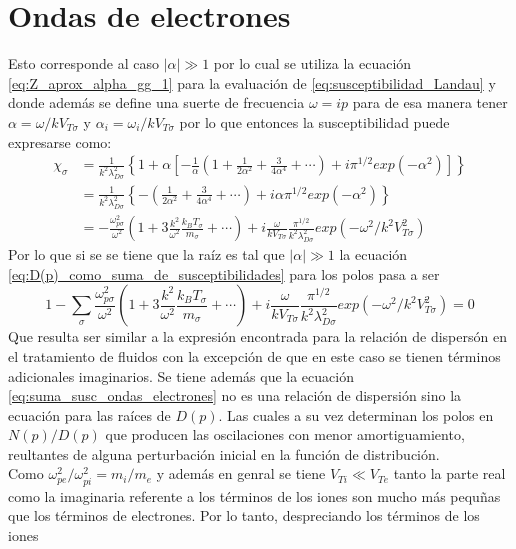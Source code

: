 \documentclass[../tesis_main_file.tex]{subfiles}
\begin{document}
\section{Ondas de electrones}
Esto corresponde al caso $|\alpha| \gg 1$ por lo cual se utiliza la ecuación \ref{eq:Z_aprox_alpha_gg_1} para la evaluación de \ref{eq:susceptibilidad_Landau} y donde además se define una suerte de frecuencia $\omega = ip$ para de esa manera tener $\alpha = \omega /kV_{T\sigma}$ y  $\alpha_i = \omega_i /kV_{T\sigma}$ por lo que entonces la susceptibilidad puede expresarse como:
\begin{equation}
\label{eq:susceptibilidad_landau_ondas_electrones}
\begin{split}
\chi _{\sigma} &= \frac{1}{k^2 \lambda^2_{D\sigma}}\left\lbrace 1+\alpha \left[-\frac{1}{\alpha}\left(1+\frac{1}{2\alpha^2}+\frac{3}{4\alpha^4}+\cdots\right)+i\pi^{1/2}exp(-\alpha^2)\right]\right\rbrace\\
&=\frac{1}{k^2 \lambda^2_{D\sigma}}\left\lbrace - \left(\frac{1}{2\alpha^2}+\frac{3}{4\alpha^4}+\cdots\right) + i\alpha\pi^{1/2}exp(-\alpha^2)\right\rbrace\\
&=-\frac{\omega^2_{p\sigma}}{\omega^2}\left(1+3\frac{k^2}{\omega^2}\frac{k_BT_{\sigma}}{m_{\sigma}}+\cdots \right)+i\frac{\omega}{kV_{T\sigma}}\frac{\pi^{1/2}}{k^2\lambda^2_{D\sigma}}exp(-\omega^2/k^2V^2_{T\sigma})
\end{split}
\end{equation}
Por lo que si se se tiene que la raíz es tal que $|\alpha |\gg 1$ la ecuación \ref{eq:D(p)_como_suma_de_susceptibilidades} para los polos pasa a ser
\begin{equation}
\label{eq:suma_susc_ondas_electrones}
1-\sum_{\sigma}\frac{\omega^2_{p\sigma}}{\omega^2}\left(1+3\frac{k^2}{\omega^2}\frac{k_BT_{\sigma}}{m_{\sigma}}+\cdots \right)+i\frac{\omega}{kV_{T\sigma}}\frac{\pi^{1/2}}{k^2\lambda^2_{D\sigma}}exp(-\omega^2/k^2V^2_{T\sigma}) =0
\end{equation}
Que resulta ser similar a la expresión encontrada para la relación de dispersón en el tratamiento de fluidos con la excepción de que en este caso se tienen términos adicionales imaginarios.
Se tiene además que la ecuación \ref{eq:suma_susc_ondas_electrones} no es una relación de dispersión sino la ecuación para las raíces de $D(p)$. Las cuales a su vez determinan los polos en $N(p)/D(p)$ que producen las oscilaciones con menor amortiguamiento, reultantes de alguna perturbación inicial en la función de distribución.\\
Como $\omega^2_{pe}/\omega^2_{pi}=m_i/m_e$ y además en genral se tiene $V_{Ti} \ll V_{Te}$ tanto la parte real como la imaginaria referente a los términos de los iones son mucho más pequñas que los términos de electrones. Por lo tanto, despreciando los términos de los iones
\end{document}
